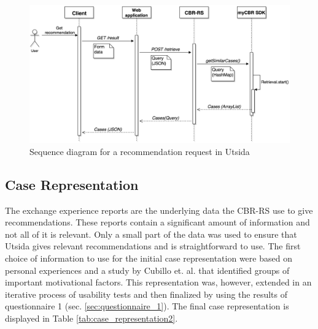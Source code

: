 \begin{figure}[h]
    \centering
    \includegraphics[width=1\textwidth]{fig/RetrievalProcessDiagram.png}
    \caption{Sequence diagram for a recommendation request in Utsida}
    \label{fig:retrieval_process_diagram}
\end{figure}

\subsection{Case Representation}

The exchange experience reports are the underlying data the CBR-RS use to give recommendations. These reports contain a significant amount of information and not all of it is relevant. Only a small part of the data was used to ensure that Utsida gives relevant recommendations and is straightforward to use. The first choice of information to use for the initial case representation were based on personal experiences and a study by Cubillo et. al. \cite{maria2006international} that identified groups of important motivational factors. This representation was, however, extended in an iterative process of usability tests and then finalized by using the results of questionnaire 1 (sec. \ref{sec:questionnaire_1}). The final case representation is displayed in Table \ref{tab:case_representation2}.

